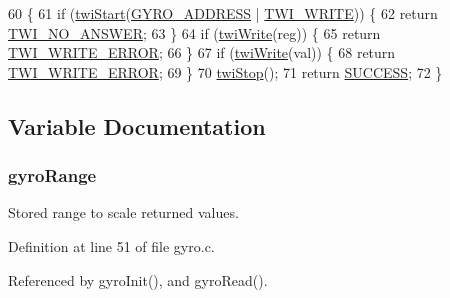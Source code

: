 \begin{DoxyCode}
60                                               \{
61     \textcolor{keywordflow}{if} (\hyperlink{group__twi_ga4f86edc73f37ce976ea2225519ab31cd}{twiStart}(\hyperlink{group__gyro_ga8ed1f343e82440b4ef900e5fe42d74f0}{GYRO\_ADDRESS} | \hyperlink{group__twi_ga3b68e8e777b71520f9dbfac733774d5f}{TWI\_WRITE})) \{
62         \textcolor{keywordflow}{return} \hyperlink{group__error_gga2c3e4bb40f36b262a5214e2da2bca9c5a04d5943ba652af2205c88b247e0c659c}{TWI\_NO\_ANSWER};
63     \}
64     \textcolor{keywordflow}{if} (\hyperlink{group__twi_gaf42e50aaf4a9794d3a2c000e7b407887}{twiWrite}(reg)) \{
65         \textcolor{keywordflow}{return} \hyperlink{group__error_gga2c3e4bb40f36b262a5214e2da2bca9c5ac0e3b3463dcaf220e54794b4711708c9}{TWI\_WRITE\_ERROR};
66     \}
67     \textcolor{keywordflow}{if} (\hyperlink{group__twi_gaf42e50aaf4a9794d3a2c000e7b407887}{twiWrite}(val)) \{
68         \textcolor{keywordflow}{return} \hyperlink{group__error_gga2c3e4bb40f36b262a5214e2da2bca9c5ac0e3b3463dcaf220e54794b4711708c9}{TWI\_WRITE\_ERROR};
69     \}
70     \hyperlink{group__twi_gabf581270e9537a60e2d8cf3d2c1543d1}{twiStop}();
71     \textcolor{keywordflow}{return} \hyperlink{group__error_gga2c3e4bb40f36b262a5214e2da2bca9c5ac7f69f7c9e5aea9b8f54cf02870e2bf8}{SUCCESS};
72 \}
\end{DoxyCode}


\subsection{Variable Documentation}
\hypertarget{group__gyro_gaa2ed27a7e4a0d8a5f492ef6059a04615}{
\subsubsection[{gyro\-Range}]{ gyro\-Range}}\label{group__gyro_gaa2ed27a7e4a0d8a5f492ef6059a04615}


Stored range to scale returned values. 



Definition at line 51 of file gyro.\-c.



Referenced by gyro\-Init(), and gyro\-Read().

